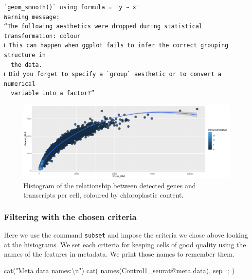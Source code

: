 \documentclass[
  letterpaper,
  DIV=11,
  numbers=noendperiod]{scrartcl}
\newenvironment{Shaded}{\begin{snugshade}}{\end{snugshade}}
\newcommand{\AttributeTok}[1]{\textcolor[rgb]{0.49,0.56,0.16}{#1}}
\newcommand{\FunctionTok}[1]{\textcolor[rgb]{0.02,0.16,0.49}{#1}}
\newcommand{\NormalTok}[1]{\textcolor[rgb]{0.00,0.44,0.13}{#1}}
\newcommand{\SpecialCharTok}[1]{\textcolor[rgb]{0.25,0.44,0.63}{#1}}
\newcommand{\StringTok}[1]{\textcolor[rgb]{0.25,0.44,0.63}{#1}}
\begin{document}
\begin{verbatim}
`geom_smooth()` using formula = 'y ~ x'
Warning message:
“The following aesthetics were dropped during statistical transformation: colour
ℹ This can happen when ggplot fails to infer the correct grouping structure in
  the data.
ℹ Did you forget to specify a `group` aesthetic or to convert a numerical
  variable into a factor?”
\end{verbatim}

\begin{figure}[H]

{\centering \includegraphics{notebook_files/figure-pdf/fig-gentrach-output-2.png}

}

\caption{\label{fig-gentrach}Histogram of the relationship between
detected genes and transcripts per cell, coloured by chloroplastic
content.}

\end{figure}

\hypertarget{filtering-with-the-chosen-criteria}{%
\subsubsection{Filtering with the chosen
criteria}\label{filtering-with-the-chosen-criteria}}

Here we use the command \texttt{subset} and impose the criteria we chose
above looking at the histograms. We set each criteria for keeping cells
of good quality using the names of the features in metadata. We print
those names to remember them.

\begin{Shaded}
\begin{Highlighting}[]
\FunctionTok{cat}\NormalTok{(}\StringTok{"Meta data names:}\SpecialCharTok{\textbackslash{}n}\StringTok{"}\NormalTok{)}
\FunctionTok{cat}\NormalTok{( }\FunctionTok{names}\NormalTok{(Control1\_seurat}\SpecialCharTok{@}\NormalTok{meta.data), }\AttributeTok{sep=}\StringTok{\textquotesingle{}; \textquotesingle{}}\NormalTok{ )}
\end{Highlighting}
\end{Shaded}
\end{document}
